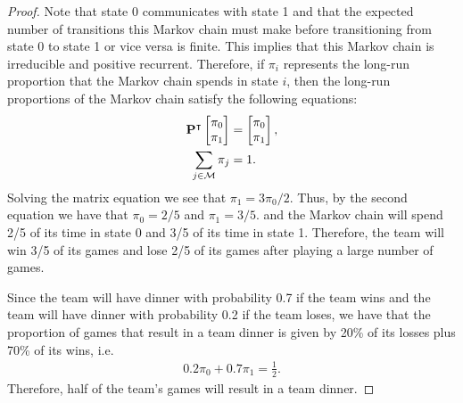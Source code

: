 \begin{proof}
  Note that state 0 communicates with state 1 and that the expected number of transitions
  this Markov chain must make before transitioning from state 0 to state 1 or vice versa is finite.
  This implies that this Markov chain is irreducible and positive recurrent. Therefore, if $\pi_i$ represents
  the long-run proportion that the Markov chain spends in state $i$, then the
  long-run proportions of the Markov chain satisfy the following equations:
  \begin{align*}
     \bold{P}^\intercal \begin{bmatrix} \pi_0 \\ \pi_1 \\ \end{bmatrix} &= \begin{bmatrix} \pi_0 \\ \pi_1 \\ \end{bmatrix},\\
     \sum_{j\in \mathcal{M}} \pi_j &= 1.
  \end{align*}
  Solving the matrix equation we see that $\pi_1 = 3\pi_0/2$. Thus, by the second equation we have that $\pi_0 = 2/5$ and $\pi_1 = 3/5$.
  and the Markov chain will spend 2/5 of its time in state 0 and 3/5 of its time in state 1. Therefore,
  the team will win 3/5 of its games and lose 2/5 of its games after playing a large number of games.

  Since the team will have dinner with probability 0.7 if the team wins and the team will have
  dinner with probability 0.2 if the team loses, we have that the proportion of games
  that result in a team dinner is given by 20\% of its losses plus 70\% of its wins, i.e.\
  \begin{align*}
    0.2 \pi_0 + 0.7 \pi_1 = \frac{1}{2}.
  \end{align*}
  Therefore, half of the team's games will result in a team dinner.
\end{proof}
\newpage

